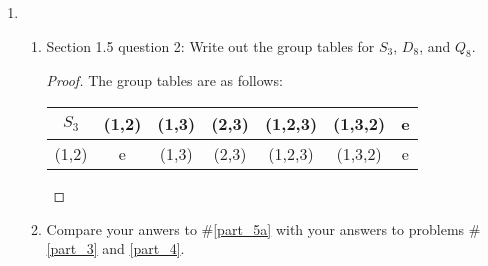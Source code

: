 \documentclass{article}
\begin{document}
\begin{enumerate}
\begin{enumerate}
\begin{proof}
\begin{center}
\begin{tabular}{|r||r|r|r|r|r|r|r|r|}
              \hline
              $-B$      & $AB$  & $-AB$ & $-I$  & $I$   & $A$   & $-A$  & $-B$  & $B$ \\
              \hline
              $AB$      & $B$   & $-B$  & $A$   & $-A$  & $I$   & $-I$  & $AB$  & $-AB$ \\
              \hline
              $-AB$     & $-B$  & $B$   & $-A$  & $A$   & $-I$  & $I$   & $-AB$ & $AB$ \\
              \hline
              $I$       & $A$   & $-A$  & $B$   & $-B$  & $AB$  & $-AB$ & $I$   & $-I$ \\
              \hline
              $-I$      & $-A$  & $A$   & $-B$  & $B$   & $-AB$ & $AB$  & $-I$  & $I$ \\
              \hline
            \end{tabular}
          \end{center}
        \end{proof}
      \item Compare your answer to part (\ref{part_a}) with your answer to
        \#\ref{part_3} above.
        \begin{proof}
          Even though groups $G$ and $H$ are non-Abelian and of order eight,
          they are not isomorphic because $G$ has only two elements of
          order two while $H$ has six.
        \end{proof}
    \end{enumerate}

  \item
    \begin{enumerate}
      \item Section 1.5 question 2: Write out the group tables for $S_3$,
        $D_8$, and $Q_8$. \label{part_5a}
        \begin{proof}
          The group tables are as follows:
          \begin{center}
            \begin{tabular}{|c||c|c|c|c|c|c|}
              \hline
              $S_3$     & (1,2)   & (1,3)   & (2,3)   & (1,2,3) & (1,3,2) & e \\
              \hline\hline
              (1,2)     & e       & (1,3)   & (2,3)   & (1,2,3) & (1,3,2) & e \\
              \hline
            \end{tabular}
          \end{center}
        \end{proof}
      \item Compare your anwers to \#\ref{part_5a} with your answers to
        problems \#\ref{part_3} and \ref{part_4}.
    \end{enumerate}


\end{enumerate}
\end{document}
